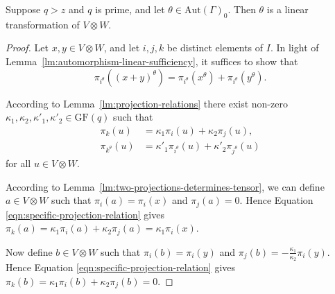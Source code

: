 \documentclass[ALCO, Unicode]{cedram}
\newcommand{\Aut}{\mathrm{Aut}}
\newcommand{\GF}{\mathrm{GF}}
\begin{document}
\begin{lemma} \label{lm:automorphism-stabiliser-linear}
Suppose $q > z$ and $q$ is prime, and let $\theta \in \Aut{\left(\Gamma \right)}_0$. Then $\theta$ is a linear transformation of $V \otimes W$.
\end{lemma}
\begin{proof}
Let $x, y \in V \otimes W$, and let $i, j, k$ be distinct elements of $I$. In light of Lemma~\ref{lm:automorphism-linear-sufficiency}, it suffices to show that
\begin{displaymath}
    \pi_{i^\theta}{\left(\left(x + y \right)^\theta \right)} = \pi_{i^\theta}{\left(x^\theta \right)} + \pi_{i^\theta}{\left(y^\theta \right)}.
\end{displaymath}

According to Lemma~\ref{lm:projection-relations} there exist non-zero $\kappa_1, \kappa_2, \kappa'_1, \kappa'_2 \in \GF{\left(q \right)}$ such that
\begin{align}
    \pi_k{\left(u \right)} &= \kappa_1 \pi_i{\left(u \right)} + \kappa_2 \pi_j{\left(u \right)}, \label{eqn:specific-projection-relation} \\
    \pi_{k^\theta}{\left(u \right)} &= \kappa'_1 \pi_{i^\theta}{\left(u \right)} + \kappa'_2 \pi_{j^\theta}{\left(u \right)} \label{eqn:specific-projection-relation-image}
\end{align}
for all $u \in V \otimes W$.

According to Lemma~\ref{lm:two-projections-determines-tensor}, we can define $a \in V \otimes W$ such that $\pi_i{\left(a \right)} = \pi_i{\left(x \right)}$ and $\pi_j{\left(a \right)} = 0$. Hence Equation \eqref{eqn:specific-projection-relation} gives $\pi_k{\left(a \right)} = \kappa_1 \pi_i{\left(a \right)} + \kappa_2 \pi_j{\left(a \right)} = \kappa_1 \pi_i{\left(x \right)}$.

Now define $b \in V \otimes W$ such that $\pi_i{\left(b \right)} = \pi_i{\left(y \right)}$ and $\pi_j{\left(b \right)} = -\frac{\kappa_1}{\kappa_2} \pi_i{\left(y \right)}$. Hence Equation \eqref{eqn:specific-projection-relation} gives $\pi_k{\left(b \right)} = \kappa_1 \pi_i{\left(b \right)} + \kappa_2 \pi_j{\left(b \right)} = 0$.


\end{proof}
\end{document}
